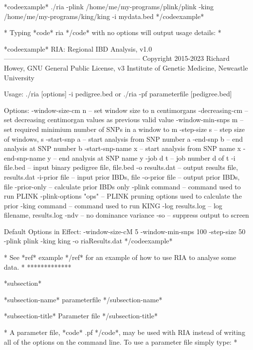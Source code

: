 *codeexample*
./ria -plink /home/me/my-programs/plink/plink -king /home/me/my-programs/king/king -i mydata.bed
*/codeexample*

*
Typing *code* ria */code* with no options will output usage details:
*

*codeexample*
RIA: Regional IBD Analysis, v1.0
------------------------------------------------------------
Copyright 2015-2023 Richard Howey, GNU General Public License, v3
Institute of Genetic Medicine, Newcastle University

Usage:
  ./ria [options] -i pedigree.bed
 or ./ria -pf parameterfile [pedigree.bed]

Options:
  -window-size-cm n     -- set window size to n centimorgans
  -decreasing-cm        -- set decreasing centimorgan values as previous valid value
  -window-min-snps m    -- set required minimium number of SNPs in a window to m
  -step-size s          -- step size of windows, s
  -start-snp a          -- start analysis from SNP number a
  -end-snp b            -- end analysis at SNP number b
  -start-snp-name x     -- start analysis from SNP name x
  -end-snp-name y       -- end analysis at SNP name y
  -job d t              -- job number d of t
  -i file.bed           -- input binary pedigree file, file.bed
  -o results.dat        -- output results file, results.dat
  -i-prior file         -- input prior IBDs, file
  -o-prior file         -- output prior IBDs, file
  -prior-only           -- calculate prior IBDs only
  -plink command        -- command used to run PLINK
  -plink-options "ops"  -- PLINK pruning options used to calculate the prior
  -king command         -- command used to run KING
  -log results.log      -- log filename, results.log
  -ndv                  -- no dominance variance
  -so                   -- suppress output to screen

Default Options in Effect:
  -window-size-cM 5
  -window-min-snps 100
  -step-size 50
  -plink plink
  -king king
  -o riaResults.dat
*/codeexample*

*
See *ref* example */ref* for an example of how to use RIA to analyse some data.
*
*************

*subsection*

*subsection-name* parameterfile */subsection-name*

*subsection-title* Parameter file */subsection-title*

* A parameter file, *code* .pf */code*, may be used with RIA instead of writing all of the options on the command line. To use a parameter file simply type: *

